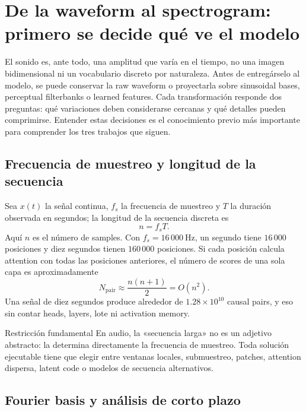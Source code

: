 \section{De la waveform al spectrogram: primero se decide qué ve el modelo}

El sonido es, ante todo, una amplitud que varía en el tiempo, no una imagen bidimensional ni un vocabulario discreto por naturaleza. Antes de entregárselo al modelo, se puede conservar la raw waveform o proyectarla sobre sinusoidal bases, perceptual filterbanks o learned features. Cada transformación responde dos preguntas: qué variaciones deben considerarse cercanas y qué detalles pueden comprimirse. Entender estas decisiones es el conocimiento previo más importante para comprender los tres trabajos que siguen.

\subsection{Frecuencia de muestreo y longitud de la secuencia}

Sea $x(t)$ la señal continua, $f_s$ la frecuencia de muestreo y $T$ la duración observada en segundos; la longitud de la secuencia discreta es
\[
n=f_sT.
\]
Aquí $n$ es el número de samples. Con $f_s=16\,000\ \mathrm{Hz}$, un segundo tiene $16\,000$ posiciones y diez segundos tienen $160\,000$ posiciones. Si cada posición calcula attention con todas las posiciones anteriores, el número de scores de una sola capa es aproximadamente
\[
N_{\mathrm{pair}}\approx \frac{n(n+1)}{2}=O(n^2).
\]
Una señal de diez segundos produce alrededor de $1.28\times10^{10}$ causal pairs, y eso sin contar heads, layers, lote ni activation memory.

\begin{importantbox}{Restricción fundamental}
En audio, la «secuencia larga» no es un adjetivo abstracto: la determina directamente la frecuencia de muestreo. Toda solución ejecutable tiene que elegir entre ventanas locales, submuestreo, patches, attention dispersa, latent code o modelos de secuencia alternativos.
\end{importantbox}

\subsection{Fourier basis y análisis de corto plazo}


